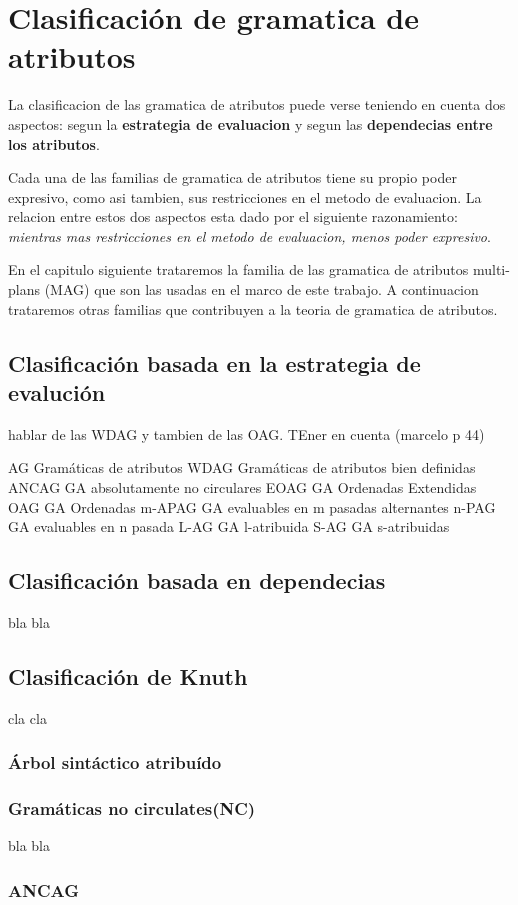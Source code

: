 \chapter{Clasificaci\'on de gramatica de atributos}
\label{chap: clas_ag}
\minitoc


La clasificacion de las gramatica de atributos puede verse teniendo en cuenta dos aspectos: segun la\textbf{ estrategia de evaluacion} y segun las \textbf{dependecias entre los atributos}. 

Cada una de las familias de gramatica de atributos tiene su propio poder expresivo, como asi tambien, sus restricciones en el metodo de evaluacion. La relacion entre estos dos aspectos esta dado por el siguiente razonamiento: \textit{mientras mas restricciones en el metodo de evaluacion, menos poder expresivo}.

En el capitulo siguiente trataremos la familia de las gramatica de atributos multi-plans (MAG) que son las usadas en el marco de este trabajo. A continuacion trataremos otras familias que contribuyen a la teoria de gramatica de atributos.

\section{Clasificaci\'on basada en la estrategia de evaluci\'on}

hablar de las WDAG y tambien de las OAG. TEner en cuenta (marcelo p 44)

        
AG      Gramáticas de atributos
WDAG    Gramáticas de atributos bien definidas   
ANCAG   GA absolutamente no circulares
EOAG    GA Ordenadas Extendidas
OAG     GA Ordenadas       
m-APAG  GA evaluables en m pasadas alternantes       
n-PAG   GA evaluables en n pasada       
L-AG    GA l-atribuida        
S-AG    GA s-atribuidas


\section{Clasificaci\'on basada en dependecias}

bla bla
\section{Clasificaci\'on de Knuth}

cla cla
\subsection{\'Arbol sint\'actico atribu\'ido}


\subsection{Gramáticas no circulates(NC)}
bla bla

\subsection{ANCAG}
